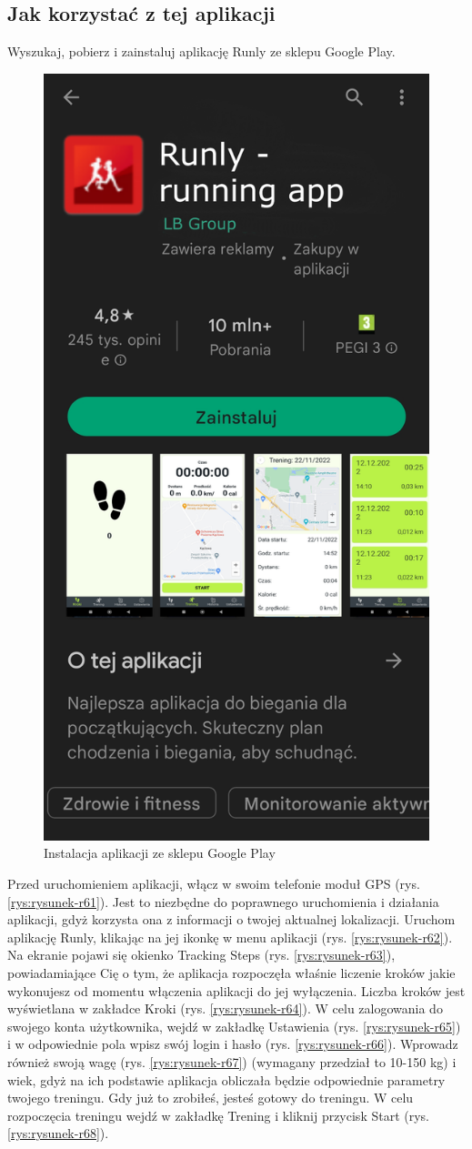 \subsection{Jak korzystać z tej aplikacji}

\hspace{0.60cm}Wyszukaj, pobierz i zainstaluj aplikację Runly ze sklepu Google Play.

\begin{figure}[!htb]
	\centering
	\includegraphics[width=.4\linewidth]{rys/runlyPS.png}
	\caption{Instalacja aplikacji ze sklepu Google Play}
	\label{rys:rysunek001epi}
\end{figure}

Przed uruchomieniem aplikacji, włącz w swoim telefonie moduł GPS (rys. \ref{rys:rysunek-r61}). Jest to niezbędne do poprawnego uruchomienia i działania aplikacji, gdyż korzysta ona z informacji o twojej aktualnej lokalizacji.
Uruchom aplikację Runly, klikając na jej ikonkę w menu aplikacji (rys. \ref{rys:rysunek-r62}).
Na ekranie pojawi się okienko Tracking Steps (rys. \ref{rys:rysunek-r63}), powiadamiające Cię o tym, że aplikacja rozpoczęła właśnie liczenie kroków jakie wykonujesz od momentu włączenia aplikacji do jej wyłączenia. Liczba kroków jest wyświetlana w zakładce Kroki (rys. \ref{rys:rysunek-r64}). W celu zalogowania do swojego konta użytkownika, wejdź w zakładkę Ustawienia (rys. \ref{rys:rysunek-r65}) i w odpowiednie pola wpisz swój login i hasło (rys. \ref{rys:rysunek-r66}). Wprowadz również swoją wagę (rys. \ref{rys:rysunek-r67}) (wymagany przedział to 10-150 kg) i wiek, gdyż na ich podstawie aplikacja obliczała będzie odpowiednie parametry twojego treningu. Gdy już to zrobiłeś, jesteś gotowy do treningu.
W celu rozpoczęcia treningu wejdź w zakładkę Trening i kliknij przycisk Start (rys. \ref{rys:rysunek-r68}). \\

